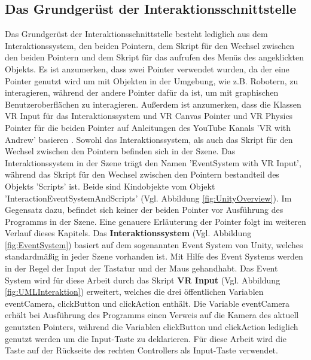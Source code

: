 \subsection{Das Grundgerüst der Interaktionsschnittstelle}\label{sec:GrundgerüstInteraktion}
Das Grundgerüst der Interaktionsschnittstelle besteht lediglich aus dem Interaktionssystem, den beiden Pointern, dem Skript für den Wechsel zwischen den beiden Pointern und dem Skript für das aufrufen des Menüs des angeklickten Objekts. Es ist anzumerken, dass zwei Pointer verwendet wurden, da der eine Pointer genutzt wird um mit Objekten in der Umgebung, wie z.B. Robotern, zu interagieren, während der andere Pointer dafür da ist, um mit graphischen Benutzeroberflächen zu interagieren. Außerdem ist anzumerken, dass die Klassen VR Input für das Interaktionssystem und VR Canvas Pointer und VR Physics Pointer für die beiden Pointer auf Anleitungen des YouTube Kanals 'VR with Andrew' basieren \cite{32}. Sowohl das Interaktionssystem, als auch das Skript für den Wechsel zwischen den Pointern befinden sich in der Szene. Das Interaktionssystem in der Szene trägt den Namen 'EventSystem with VR Input', während das Skript für den Wechsel zwischen den Pointern bestandteil des Objekts 'Scripts' ist. Beide sind Kindobjekte vom Objekt 'InteractionEventSystemAndScripts' (Vgl. Abbildung \ref{fig:UnityOverview}). Im Gegensatz dazu, befindet sich keiner der beiden Pointer vor Ausführung des Programms in der Szene. Eine genauere Erläuterung der Pointer folgt im weiteren Verlauf dieses Kapitels.
\newline\newline
Das \textbf{Interaktionssystem} (Vgl. Abbildung \ref{fig:EventSystem}) basiert auf dem sogenannten Event System von Unity, welches standardmäßig in jeder Szene vorhanden ist. Mit Hilfe des Event Systems werden in der Regel der Input der Tastatur und der Maus gehandhabt. Das Event System wird für diese Arbeit durch das Skript \textbf{VR Input} (Vgl. Abbildung \ref{fig:UMLInteraktion}) erweitert, welches die drei öffentlichen Variablen eventCamera, clickButton und clickAction enthält. Die Variable eventCamera erhält bei Ausführung des Programms einen Verweis auf die Kamera des aktuell genutzten Pointers, während die Variablen clickButton und clickAction lediglich genutzt werden um die Input-Taste zu deklarieren. Für diese Arbeit wird die Taste auf der Rückseite des rechten Controllers als Input-Taste verwendet.
\newline
